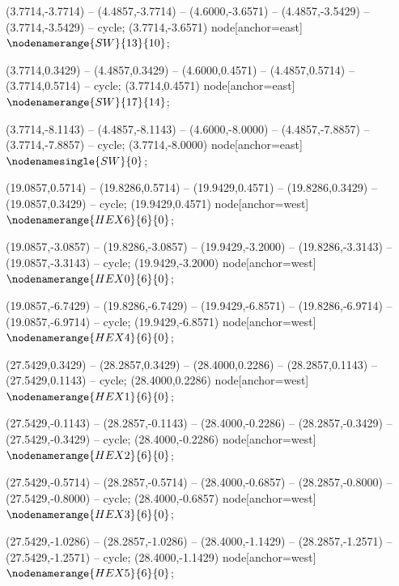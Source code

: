    (3.7714,-3.7714) -- (4.4857,-3.7714) -- (4.6000,-3.6571) -- (4.4857,-3.5429) -- (3.7714,-3.5429) -- cycle;
   (3.7714,-3.6571) node[anchor=east] {$\nodenamerange{SW}{13}{10}$};

   (3.7714,0.3429) -- (4.4857,0.3429) -- (4.6000,0.4571) -- (4.4857,0.5714) -- (3.7714,0.5714) -- cycle;
   (3.7714,0.4571) node[anchor=east] {$\nodenamerange{SW}{17}{14}$};

   (3.7714,-8.1143) -- (4.4857,-8.1143) -- (4.6000,-8.0000) -- (4.4857,-7.8857) -- (3.7714,-7.8857) -- cycle;
   (3.7714,-8.0000) node[anchor=east] {$\nodenamesingle{SW}{0}$};

   (19.0857,0.5714) -- (19.8286,0.5714) -- (19.9429,0.4571) -- (19.8286,0.3429) -- (19.0857,0.3429) -- cycle;
   (19.9429,0.4571) node[anchor=west] {$\nodenamerange{HEX6}{6}{0}$};

   (19.0857,-3.0857) -- (19.8286,-3.0857) -- (19.9429,-3.2000) -- (19.8286,-3.3143) -- (19.0857,-3.3143) -- cycle;
   (19.9429,-3.2000) node[anchor=west] {$\nodenamerange{HEX0}{6}{0}$};

   (19.0857,-6.7429) -- (19.8286,-6.7429) -- (19.9429,-6.8571) -- (19.8286,-6.9714) -- (19.0857,-6.9714) -- cycle;
   (19.9429,-6.8571) node[anchor=west] {$\nodenamerange{HEX4}{6}{0}$};

   (27.5429,0.3429) -- (28.2857,0.3429) -- (28.4000,0.2286) -- (28.2857,0.1143) -- (27.5429,0.1143) -- cycle;
   (28.4000,0.2286) node[anchor=west] {$\nodenamerange{HEX1}{6}{0}$};

   (27.5429,-0.1143) -- (28.2857,-0.1143) -- (28.4000,-0.2286) -- (28.2857,-0.3429) -- (27.5429,-0.3429) -- cycle;
   (28.4000,-0.2286) node[anchor=west] {$\nodenamerange{HEX2}{6}{0}$};

   (27.5429,-0.5714) -- (28.2857,-0.5714) -- (28.4000,-0.6857) -- (28.2857,-0.8000) -- (27.5429,-0.8000) -- cycle;
   (28.4000,-0.6857) node[anchor=west] {$\nodenamerange{HEX3}{6}{0}$};

   (27.5429,-1.0286) -- (28.2857,-1.0286) -- (28.4000,-1.1429) -- (28.2857,-1.2571) -- (27.5429,-1.2571) -- cycle;
   (28.4000,-1.1429) node[anchor=west] {$\nodenamerange{HEX5}{6}{0}$};

